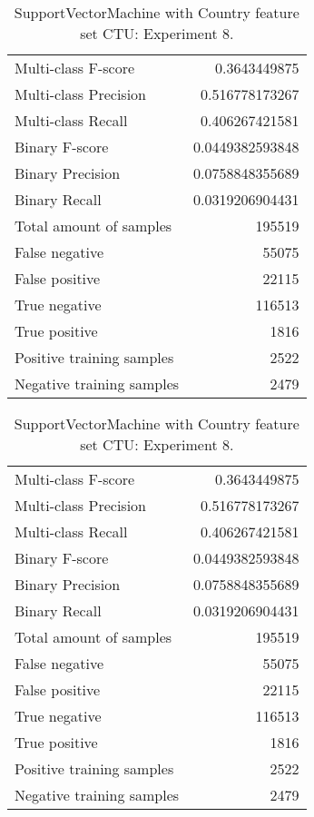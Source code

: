 \begin{table}[H]
\begin{minipage}{0.5\textwidth}
\caption{SupportVectorMachine with Country feature set CTU: Experiment 7.}
\centering
\begin{tabular}{l r}
\toprule
Multi-class F-score & 0.3643449875 \\
Multi-class Precision & 0.516778173267 \\
Multi-class Recall & 0.406267421581 \\
\midrule
Binary F-score & 0.0449382593848 \\
Binary Precision & 0.0758848355689 \\
Binary Recall & 0.0319206904431 \\
\midrule
Total amount of samples & 195519 \\
False negative & 55075 \\
False positive & 22115 \\
True negative & 116513 \\
True positive & 1816 \\
\midrule
Positive training samples & 2522 \\
Negative training samples & 2479 \\
\bottomrule
\end{tabular}
\end{minipage}
\hfillx
\begin{minipage}{0.5\textwidth}
\caption{SupportVectorMachine with Country feature set CTU: Experiment 8.}
\centering
\begin{tabular}{l r}
\toprule
Multi-class F-score & 0.3643449875 \\
Multi-class Precision & 0.516778173267 \\
Multi-class Recall & 0.406267421581 \\
\midrule
Binary F-score & 0.0449382593848 \\
Binary Precision & 0.0758848355689 \\
Binary Recall & 0.0319206904431 \\
\midrule
Total amount of samples & 195519 \\
False negative & 55075 \\
False positive & 22115 \\
True negative & 116513 \\
True positive & 1816 \\
\midrule
Positive training samples & 2522 \\
Negative training samples & 2479 \\
\bottomrule
\end{tabular}
\end{minipage}
\end{table}
